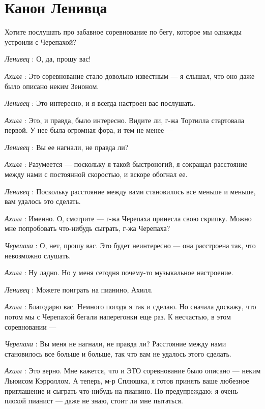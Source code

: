 \documentclass[../main.tex]{subfiles}
\begin{document}
\section{Канон Ленивца}


\begin{dialogue}

 Хотите послушать про забавное соревнование по бегу, которое мы однажды устроили с Черепахой?

\emph{Ленивец} : О, да, прошу вас!

\emph{Ахилл} : Это соревнование стало довольно известным --- я слышал, что оно даже было описано неким Зеноном.

\emph{Ленивец} : Это интересно, и я всегда настроен вас послушать.

\emph{Ахилл} : Это, и правда, было интересно. Видите ли, г-жа Тортилла стартовала первой. У нее была огромная фора, и тем не менее ---

\emph{Ленивец} : Вы ее нагнали, не правда ли?

\emph{Ахилл} : Разумеется --- поскольку я такой быстроногий, я сокращал расстояние между нами с постоянной скоростью, и вскоре обогнал ее.

\emph{Ленивец} : Поскольку расстояние между вами становилось все меньше и меньше, вам удалось это сделать.

\emph{Ахилл} : Именно. О, смотрите --- г-жа Черепаха принесла свою скрипку. Можно мне попробовать что-нибудь сыграть, г-жа Черепаха?

\emph{Черепаха} : О, нет, прошу вас. Это будет неинтересно --- она расстроена так, что невозможно слушать.

\emph{Ахилл} : Ну ладно. Но у меня сегодня почему-то музыкальное настроение.

\emph{Ленивец} : Можете поиграть на пианино, Ахилл.

\emph{Ахилл} : Благодарю вас. Немного погодя я так и сделаю. Но сначала доскажу, что потом мы с Черепахой бегали наперегонки еще раз. К несчастью, в этом соревновании ---

\emph{Черепаха} : Вы меня не нагнали, не правда ли? Расстояние между нами становилось все больше и больше, так что вам не удалось этого сделать.

\emph{Ахилл} : Это верно. Мне кажется, что и ЭТО соревнование было описано --- неким Льюисом Кэрроллом. А теперь, м-р Сплюшка, я готов принять ваше любезное приглашение и сыграть что-нибудь на пианино. Но предупреждаю: я очень плохой пианист --- даже не знаю, стоит ли мне пытаться.


\end{dialogue}
\end{document}
